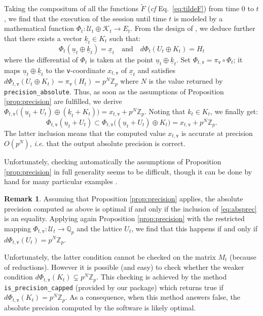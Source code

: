 \documentclass[sigconf]{acmart}
\newcommand{\Z}{\mathbb Z}
\newcommand{\Zp}{\Z_p}
\newcommand{\Q}{\mathbb Q}
\newcommand{\Qp}{\Q_p}
\newcommand{\ttv}{\texttt{v}\xspace}
\newcommand{\calU}{\mathcal{U}}
\newcommand{\calK}{\mathcal{K}}
\newcommand{\ZpLC}{\text{\color{output} \rm \tt ZpLC}\xspace}
\theoremstyle{definition}
\newtheorem{rmk}[theo]{Remark}
\begin{document}
Taking the compositum of all the functions $\tilde F$ (\emph{cf} 
Eq.~\eqref{eq:tildeF}) from time $0$ to $t$, we find that the execution 
of the session until time $t$ is modeled by a mathematical function
$\Phi_t : \calU_t \oplus \calK_t \to E_t$.
From the design of \ZpLC, we deduce further that there exists a 
vector $\underline k_t \in K_t$ such that:
$$\Phi_t(\underline u_t \oplus \underline k_t) = \underline x_t 
\quad \text{and} \quad
d\Phi_t (U_t \oplus K_t) = H_t$$
where the differential of $\Phi_t$ is taken at the point
$\underline u_t \oplus \underline k_t$. 
Set $\Phi_{t,\ttv} = \pi_\ttv \circ \Phi_t$; it maps 
$\underline u_t \oplus \underline k_t$ to the \ttv-coordinate 
$x_{t,\ttv}$ of $\underline x_t$ and satisfies
$d\Phi_{t,\ttv} (U_t \oplus K_t) = \pi_\ttv(H_t) = p^N \Zp$
where $N$ is the value returned by {\color{method}\verb?precision_absolute?}. Thus, 
as soon as the assumptions of Proposition \ref{prop:precision} are
fulfilled, we derive
$\Phi_{t,\ttv} \big((\underline u_t + U_t) \oplus (\underline k_t + K_t)\big) = 
x_{t,\ttv} + p^N \Zp$.
Noting that $k_t \in K_t$, we finally get:
\begin{equation}
\label{eq:absprec}
\Phi_{t,\ttv} (\underline u_t + U_t) \subset
\Phi_{t,\ttv} \big((\underline u_t + U_t) \oplus K_t\big) = 
x_{t,\ttv} + p^N \Zp.
\end{equation}
The latter inclusion means that the computed value $x_{t,\ttv}$ is
accurate at precision $O(p^N)$, \emph{i.e.} that the output absolute
precision is correct. 

Unfortunately, checking automatically the assumptions of Proposition 
\ref{prop:precision} in full generality seems to be difficult, though it 
can be done by hand for many particular examples \cite{}.

\begin{rmk}
Assuming that Proposition \ref{prop:precision} applies, 
the absolute precision computed as above is optimal if and only if
the inclusion of \eqref{eq:absprec} is an equality. Applying again
Proposition \ref{prop:precision}
with the restricted mapping $\Phi_{t,\ttv} : \calU_t \to \Qp$ and the
lattice $U_t$, we find that this happens if and only if
$d\Phi_{t,\ttv}(U_t) = p^N \Zp$.

Unfortunately, the latter condition cannot be checked on the matrix 
$M_t$ (because of reductions). 
However it is possible (and easy) to check whether the weaker condition 
$d\Phi_{t,\ttv}(K_t) \subsetneq p^N \Zp$. This checking is achieved by 
the method
\verb?is_precision_capped? (provided by our package) which returns true 
if $d\Phi_{t,\ttv}(K_t) = p^N \Zp$. As a consequence, when this method
answers false, the absolute precision computed by the software is
likely optimal.
\end{rmk}
\end{document}
